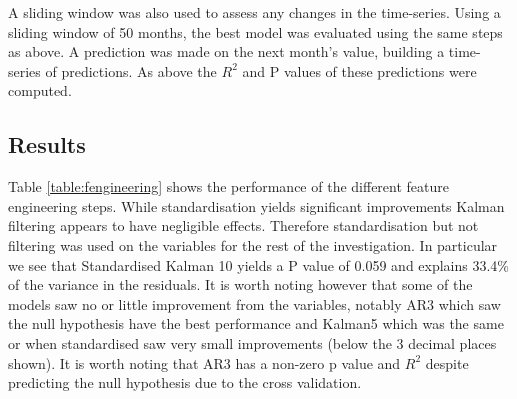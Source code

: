 \documentclass{sig-alternate-05-2015}
\begin{document}
A sliding window was also used to assess any changes in the time-series. Using a sliding window of 50 months, the best model was evaluated using the same steps as above. A prediction was made on the next month's value, building a time-series of predictions. As above the $R^2$ and P values of these predictions were computed. 

\subsection{Results}
Table \ref{table:fengineering} shows the performance of the different feature engineering steps. While standardisation yields significant improvements Kalman filtering appears to have negligible effects. Therefore standardisation but not filtering was used on the variables for the rest of the investigation. In particular we see that Standardised Kalman 10 yields a P value of 0.059 and explains 33.4\% of the variance in the residuals. It is worth noting however that some of the models saw no or little improvement from the variables, notably AR3 which saw the null hypothesis have the best performance and Kalman5 which was the same or when standardised saw very small improvements (below the 3 decimal places shown). It is worth noting that AR3 has a non-zero p value and $R^2$ despite predicting the null hypothesis due to the cross validation. 
\end{document}
